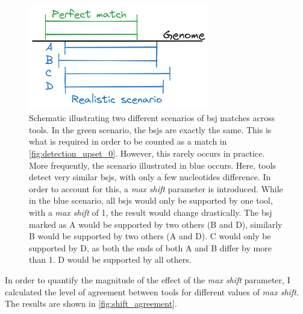 \begin{figure}[H] \centering

    \includegraphics[width=0.7\textwidth]{chapters/4_results_and_discussion/figures/grouping.png}
    \caption{Schematic illustrating two different scenarios of \gls{bsj}
        matches
        across tools.
        In the green scenario, the \gls{bsj}s are exactly the same.
        This is what is required in order to be counted as a match in
        \cref{fig:detection_upset_0}.
        However, this rarely occurs in practice.
        More frequently, the scenario illustrated in blue occurs.
        Here, tools detect very similar \gls{bsj}s, with only a few nucleotides
        difference.
        In order to account for this, a \textit{max shift} parameter is introduced.
        While in the blue scenario, all \gls{bsj}s would only be supported by one tool,
        with a \textit{max shift} of 1, the result would change drastically.
        The \gls{bsj} marked as A would be supported by two others (B and D), similarly
        B would be supported by two others (A and D).
        C would only be supported by D, as both the ends of both A and B differ by more
        than 1.
        D would be supported by all others.
    }
    \label{fig:detection_shift_schematic}
\end{figure}

In order to quantify the magnitude of the effect of the \textit{max shift}
parameter, I calculated the level of agreement between tools for different
values of \textit{max shift}.
The results are shown in \cref{fig:shift_agreement}.

